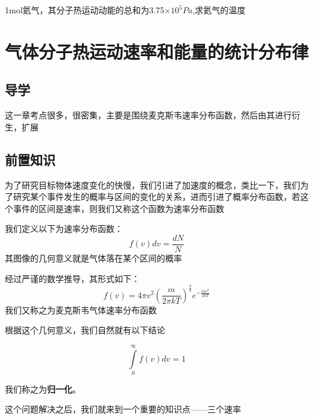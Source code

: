 \documentclass[lang=cn,10pt]{elegantbook}
\begin{document}
	\begin{example}
		1mol氦气，其分子热运动动能的总和为3.75$\times 10^{5}Pa$,求氦气的温度
	\end{example}
    \begin{solution}
		
	\end{solution}
	\chapter{气体分子热运动速率和能量的统计分布律}
	\section{导学}
	这一章考点很多，很密集，主要是围绕麦克斯韦速率分布函数，然后由其进行衍生，扩展
	\section{前置知识}
	
	 为了研究目标物体速度变化的快慢，我们引进了加速度的概念，类比一下，我们为了研究某个事件发生的概率与区间的变化的关系，进而引进了概率分布函数，若这个事件的区间是速率，则我们又称这个函数为速率分布函数
	 
	 \begin{definition}[速率分布函数]
	 	我们定义以下为速率分布函数：
	 	\begin{equation*}
	 		f\left( v \right) dv=\frac{dN}{N}
	 	\end{equation*}
	 	其图像的几何意义就是气体落在某个区间的概率
	 	
	 	经过严谨的数学推导，其形式如下：
	 	\begin{equation*}
	 		f\left( v \right) =4\pi v^2\left( \frac{m}{2\pi kT} \right) ^{\frac{3}{2}}e^{-\frac{mv^2}{2kT}}
	 	\end{equation*}我们又称之为麦克斯韦气体速率分布函数
	 \end{definition}
	 
	 根据这个几何意义，我们自然就有以下结论
	 
	 \begin{conclusion}
	 	\begin{equation*}
	 		\int\limits_0^{\infty}{f\left( v \right) dv}=1
	 	\end{equation*}
	 \end{conclusion}
	 我们称之为\textbf{归一化}。
	 
	 这个问题解决之后，我们就来到一个重要的知识点——三个速率
	 
\end{document}
